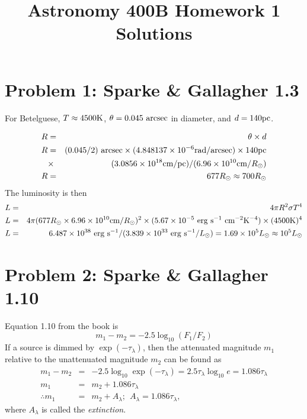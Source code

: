 \documentclass[]{article}
\title{Astronomy 400B Homework 1 Solutions}
\author{\vspace{-10ex}}
\date{\vspace{-10ex}}
\begin{document}
\maketitle

\section{Problem 1: Sparke \& Gallagher 1.3}

For Betelguese, $T\approx4500\mathrm{K}$, $\theta=0.045~\mathrm{arcsec}$ in diameter, and $d=140\mathrm{pc}$.

\begin{eqnarray}
R &=& \theta \times d\\
R &=& (0.045/2)~\mathrm{arcsec} \times (4.848137 \times 10^{-6} \mathrm{rad} / \mathrm{arcsec}) \times 140 \mathrm{pc} \nonumber \\ &\times& (3.0856\times10^{18}\mathrm{cm}/\mathrm{pc}) / (6.96\times10^{10} \mathrm{cm}/R_{\odot}) \\
R &=& 677R_{\odot} \approx 700R_{\odot}
\end{eqnarray}
\noindent
The luminosity is then
\begin{eqnarray}
L &=& 4\pi R^2 \sigma T^{4}\\
L &=& 4\pi (677R_{\odot}\times 6.96\times 10^{10}\mathrm{cm}/R_{\odot})^{2} \times (5.67 \times10^{-5}~\mathrm{erg}~\mathrm{s}^{-1}~\mathrm{cm}^{-2}\mathrm{K}^{-4})\times(4500\mathrm{K})^{4}\\
L &=& 6.487\times10^{38}~\mathrm{erg}~\mathrm{s}^{-1} / (3.839\times10^{33}~\mathrm{erg}~\mathrm{s}^{-1} / L_{\odot}) = 1.69\times10^{5}L_{\odot}\approx10^{5}L_{\odot}
\end{eqnarray}

\section{Problem 2: Sparke \& Gallagher 1.10}

Equation 1.10 from the book is
\begin{equation}
m_1 - m_2 = -2.5 \log_{10} (F_1/F_2)
\end{equation}
\noindent
If a source is dimmed by $\exp(-\tau_{\lambda})$, then
the attenuated magnitude $m_1$ relative to the unattenuated
magnitude $m_2$ can be found as
\begin{eqnarray}
m_1 - m_2 &=& -2.5 \log_{10} \exp(-\tau_{\lambda}) = 2.5 \tau_{\lambda} \log_{10} e = 1.086\tau_{\lambda}\\
m_1 &=& m_2 + 1.086\tau_{\lambda}\\
\therefore m_1 &=& m_2 + A_{\lambda};~~A_{\lambda} = 1.086\tau_{\lambda},
\end{eqnarray}
\noindent
where $A_{\lambda}$ is called the {\it extinction}.
\end{document}
